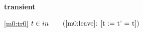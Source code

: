 \textbf{transient}
\begin{block}
\item[ \eqref{m0:tr0} ]$t \in in  \qquad \text{(\ref{m0:leave}: [t := t' = t])}$ %
\end{block}

